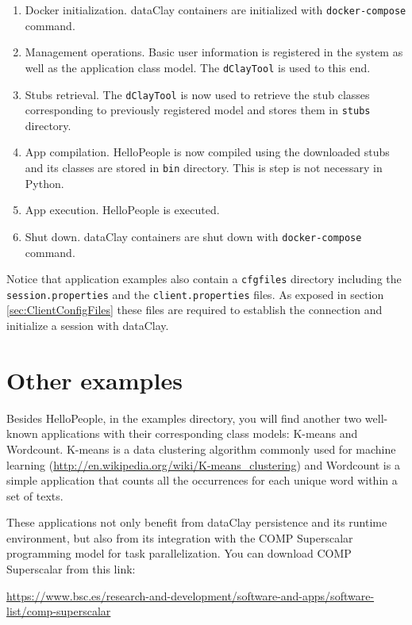 \begin{enumerate}
 \item Docker initialization. dataClay containers are initialized with \texttt{docker-compose} command.
 \item Management operations. Basic user information is registered in the system as well as the application class model. The \texttt{dClayTool} is used to this end.
 \item Stubs retrieval. The \texttt{dClayTool} is now used to retrieve the stub classes corresponding to previously registered model and stores them in \texttt{stubs} directory.
 \item App compilation. HelloPeople is now compiled using the downloaded stubs and its classes are stored in \texttt{bin} directory. This is step is not necessary in Python.
 \item App execution. HelloPeople is executed.
 \item Shut down. dataClay containers are shut down with \texttt{docker-compose} command.
\end{enumerate}

Notice that application examples also contain a \texttt{cfgfiles} directory including the \texttt{session.properties} and the \texttt{client.properties} files. As exposed in section \ref{sec:ClientConfigFiles} these files are required to establish the connection and initialize a session with dataClay.

\section{Other examples}
\label{sec:FullTestOtherExamples}

Besides HelloPeople, in the examples directory, you will find another two well-known applications with their corresponding class models: K-means and Wordcount. K-means is a data clustering algorithm commonly used for machine learning (\url{http://en.wikipedia.org/wiki/K-means\_clustering}) and Wordcount is a simple application that counts all the occurrences for each unique word within a set of texts.

These applications not only benefit from dataClay persistence and its runtime environment, but also from its integration with the COMP Superscalar programming model \cite{tejedor2017pycompss} \cite{BADIA201532} for task parallelization. You can download COMP Superscalar from this link: 

{\begin{center} \scriptsize \url{https://www.bsc.es/research-and-development/software-and-apps/software-list/comp-superscalar} \end{center}}

